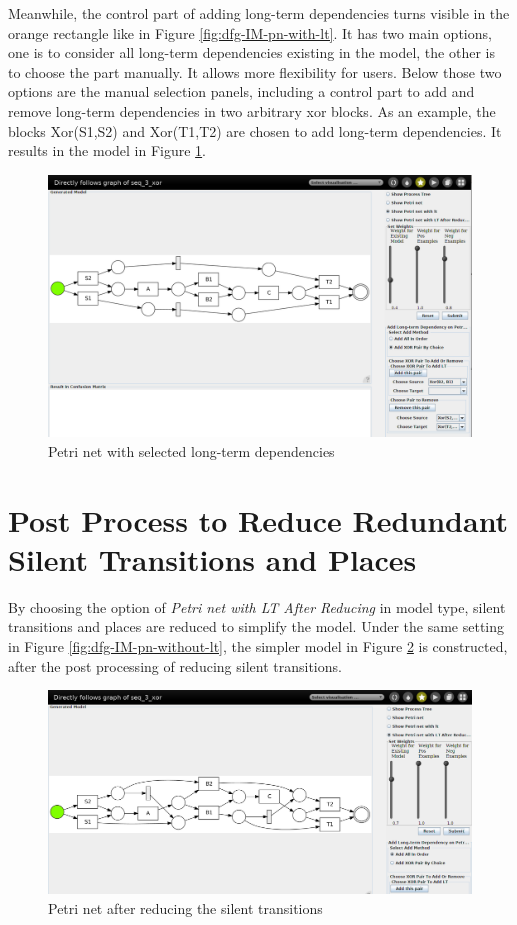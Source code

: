 Meanwhile, the control part of adding long-term dependencies turns visible in the orange rectangle like in Figure \ref{fig:dfg-IM-pn-with-lt}.  It has two main options, one is to consider all long-term dependencies existing in the model, the other is to choose the part manually. It allows more flexibility for users. Below those two options are the manual selection panels, including a control part to add and remove long-term dependencies in two arbitrary xor blocks. As an example, the blocks Xor(S1,S2) and Xor(T1,T2) are chosen to add long-term dependencies. It results in the model in Figure \ref{fig:dfg-IM-pn-with-lt-m}. 
\begin{figure}[h]
	\centering
	\includegraphics[width=\textwidth]{figures/implementation/dfg-IM-pn-with-lt-manual.png}
	\caption{Petri net with selected long-term dependencies}
	\label{fig:dfg-IM-pn-with-lt-m}
\end{figure}
\section{Post Process to Reduce Redundant Silent Transitions and Places}
By choosing the option of \emph{Petri net with LT After Reducing} in model type, silent transitions and places are reduced to simplify the model.
Under the same setting in Figure \ref{fig:dfg-IM-pn-without-lt}, the simpler model in Figure \ref{fig:dfg-IM-pn-with-lt-r} is constructed, after the post processing of reducing silent transitions.
\begin{figure}[h]
	\centering
	\includegraphics[width=\textwidth]{figures/implementation/dfg-IM-pn-with-lt-reduced.png}
	\caption{Petri net after reducing the silent transitions}
	\label{fig:dfg-IM-pn-with-lt-r}
\end{figure}

